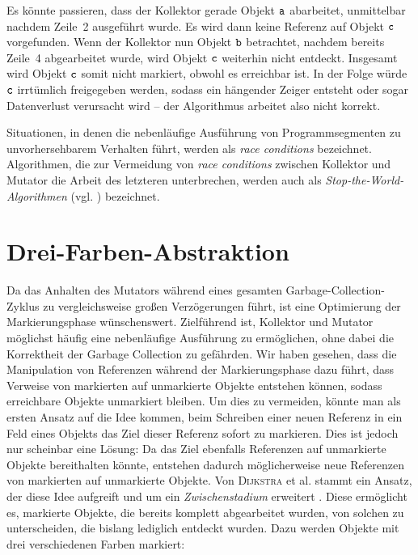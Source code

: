 Es könnte passieren, dass der Kollektor gerade Objekt $\texttt{a}$ abarbeitet, unmittelbar nachdem Zeile~2 ausgeführt wurde.
Es wird dann keine Referenz auf Objekt $\texttt{c}$ vorgefunden.
Wenn der Kollektor nun Objekt $\texttt{b}$ betrachtet, nachdem bereits Zeile~4 abgearbeitet wurde, wird Objekt $\texttt{c}$ weiterhin nicht entdeckt.
Insgesamt wird Objekt $\texttt{c}$ somit nicht markiert, obwohl es erreichbar ist.
In der Folge würde $\texttt{c}$ irrtümlich freigegeben werden, sodass ein hängender Zeiger entsteht oder sogar Datenverlust verursacht wird -- der Algorithmus arbeitet also nicht korrekt.

Situationen, in denen die nebenläufige Ausführung von Programmsegmenten zu unvorhersehbarem Verhalten führt, werden als \textit{race conditions} bezeichnet.
Algorithmen, die zur Vermeidung von \textit{race conditions} zwischen Kollektor und Mutator die Arbeit des letzteren unterbrechen, werden auch als \textit{Stop-the-World-Algorithmen} (vgl. \cite[S. 2]{levanoni2006}) bezeichnet.




\section{Drei-Farben-Abstraktion}
\label{sec:tricolor}
Da das Anhalten des Mutators während eines gesamten Garbage-Collection-Zyklus zu vergleichsweise großen Verzögerungen führt, ist eine Optimierung der Markierungsphase wünschenswert.
Zielführend ist, Kollektor und Mutator möglichst häufig eine nebenläufige Ausführung zu ermöglichen, ohne dabei die Korrektheit der Garbage Collection zu gefährden.
Wir haben gesehen, dass die Manipulation von Referenzen während der Markierungsphase dazu führt, dass Verweise von markierten auf unmarkierte Objekte entstehen können, sodass erreichbare Objekte unmarkiert bleiben.
Um dies zu vermeiden, könnte man als ersten Ansatz auf die Idee kommen, beim Schreiben einer neuen Referenz in ein Feld eines Objekts das Ziel dieser Referenz sofort zu markieren.
Dies ist jedoch nur scheinbar eine Lösung:
Da das Ziel ebenfalls Referenzen auf unmarkierte Objekte bereithalten könnte, entstehen dadurch möglicherweise neue Referenzen von markierten auf unmarkierte Objekte.
Von \textsc{Dijkstra} et al. stammt ein Ansatz, der diese Idee aufgreift und um ein \textit{Zwischenstadium} erweitert \cite[S. 969f]{dijkstra1978}.
Diese ermöglicht es, markierte Objekte, die bereits komplett abgearbeitet wurden, von solchen zu unterscheiden, die bislang lediglich entdeckt wurden.
Dazu werden Objekte mit drei verschiedenen Farben markiert:

